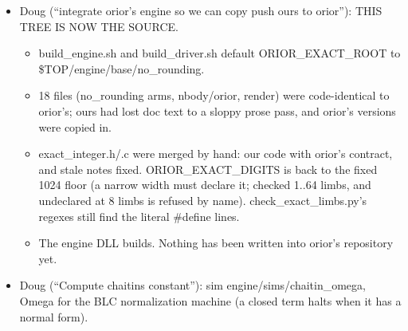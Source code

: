 \begin{enumerate}
\begin{itemize}
\begin{itemize}
\begin{itemize}
\item Wired through engine\_\allowbreak{}config.h, keymath imprint (bits: quotient = left, remainder = min, gcd = max), key\_\allowbreak{}schedule refs, cycle.c (host, the library itself) and cycle.cu (device Knuth D, Euclid, and multiply-and-mask on the register arrays).
\item The kernel is templated <WIDE, DIVIDES>: only a dividing program carries 5·WIDE+4 limbs of scratch.
\item test/engine/record\_\allowbreak{}divide\_\allowbreak{}test passes 15/0: device = host word for word in the 64- and 256-limb files, with identities, exact factors, refusals and imprint order. record\_\allowbreak{}table\_\allowbreak{}test still passes.
\end{itemize}
\item Doug (“integrate orior's engine so we can copy push ours to orior”): THIS TREE IS NOW THE SOURCE.

\begin{itemize}
\item build\_\allowbreak{}engine.sh and build\_\allowbreak{}driver.sh default ORIOR\_\allowbreak{}EXACT\_\allowbreak{}ROOT to \$TOP/engine/base/no\_\allowbreak{}rounding.
\item 18 files (no\_\allowbreak{}rounding arms, nbody/orior, render) were code-identical to orior's; ours had lost doc text to a sloppy prose pass, and orior's versions were copied in.
\item exact\_\allowbreak{}integer.h/.c were merged by hand: our code with orior's contract, and stale notes fixed. ORIOR\_\allowbreak{}EXACT\_\allowbreak{}DIGITS is back to the fixed 1024 floor (a narrow width must declare it; checked 1..64 limbs, and undeclared at 8 limbs is refused by name). check\_\allowbreak{}exact\_\allowbreak{}limbs.py's regexes still find the literal \#define lines.
\item The engine DLL builds. Nothing has been written into orior's repository yet.
\end{itemize}
\item Doug (“Compute chaitins constant”): sim engine/sims/chaitin\_\allowbreak{}omega, Omega for the BLC normalization machine (a closed term halts when it has a normal form).


\end{itemize}
\end{itemize}
\end{enumerate}

